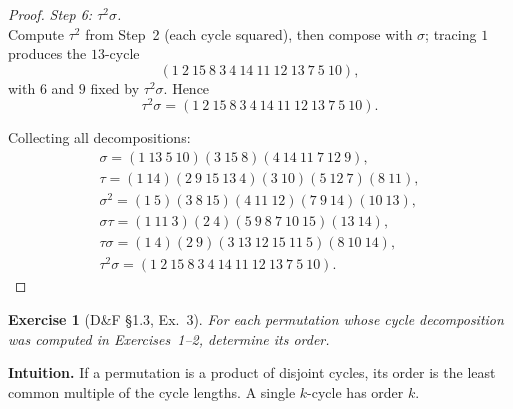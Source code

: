 \documentclass[12pt]{article}
\newtheorem{exercise}[theorem]{Exercise}
\theoremstyle{definition}
\begin{document}
\begin{proof}
\dotfill

\noindent\emph{Step 6: $\tau^{2}\sigma$.}\\
Compute $\tau^{2}$ from Step~2 (each cycle squared), then compose with $\sigma$; tracing $1$ produces the $13$-cycle
\[
(1\ 2\ 15\ 8\ 3\ 4\ 14\ 11\ 12\ 13\ 7\ 5\ 10),
\]
with $6$ and $9$ fixed by $\tau^{2}\sigma$. Hence
\[
\tau^{2}\sigma=(1\ 2\ 15\ 8\ 3\ 4\ 14\ 11\ 12\ 13\ 7\ 5\ 10).
\]

\dotfill

Collecting all decompositions:
\[
\begin{aligned}
\sigma=(1\ 13\ 5\ 10)(3\ 15\ 8)(4\ 14\ 11\ 7\ 12\ 9),\\
\tau=(1\ 14)(2\ 9\ 15\ 13\ 4)(3\ 10)(5\ 12\ 7)(8\ 11),\\
\sigma^{2}=(1\ 5)(3\ 8\ 15)(4\ 11\ 12)(7\ 9\ 14)(10\ 13),\\
\sigma\tau=(1\ 11\ 3)(2\ 4)(5\ 9\ 8\ 7\ 10\ 15)(13\ 14),\\
\tau\sigma=(1\ 4)(2\ 9)(3\ 13\ 12\ 15\ 11\ 5)(8\ 10\ 14),\\
\tau^{2}\sigma=(1\ 2\ 15\ 8\ 3\ 4\ 14\ 11\ 12\ 13\ 7\ 5\ 10).
\end{aligned}
\]
\end{proof}

\newpage

\begin{exercise}[D\&F §1.3, Ex.~3]
For each permutation whose cycle decomposition was computed in Exercises~1–2, determine its order.
\end{exercise}

\dotfill

\noindent
\textbf{Intuition.}
If a permutation is a product of disjoint cycles, its order is the least common multiple
of the cycle lengths. A single $k$-cycle has order $k$.

\dotfill
\end{document}
